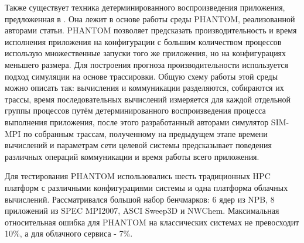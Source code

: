 		Также существует техника детерминированного воспроизведения приложения, предложенная в \cite{representative_replay}. Она лежит в основе работы среды PHANTOM, реализованной авторами статьи. PHANTOM позволяет предсказать производительность и время исполнения приложения на конфигурации с большим количеством процессов использую множественные запуски того же приложения, но на конфигурациях меньшего размера. Для построения прогноза производительности используется подход симуляции на основе трассировки. Общую схему работы этой среды можно описать так: вычисления и коммуникации разделяются, собираются их трассы, время последовательных вычислений измеряется для каждой отдельной группы процессов путём детерминированного воспроизведения процесса выполнения приложения, после этого разработанный авторами симулятор SIM-MPI по собранным трассам, полученному на предыдущем этапе времени вычислений и параметрам сети целевой системы предсказывает поведения различных операций коммуникации и время работы всего приложения.

		Для тестирования PHANTOM использовались шесть традиционных HPC платформ с различными конфигурациями системы и одна платформа облачных вычислений. Рассматривался большой набор бенчмарков: 6 ядер из NPB, 8 приложений из SPEC MPI2007, ASCI Sweep3D и NWChem. Максимальная относительная ошибка для PHANTOM на классических системах не превосходит 10\%, а для облачного сервиса - 7\%.


